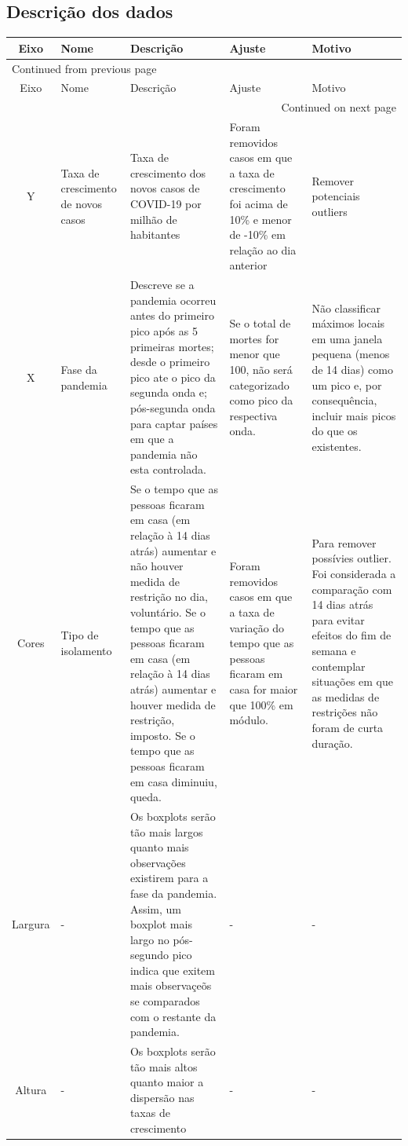 \documentclass{SelfArx}
\begin{document}
\subsection*{Descrição dos dados}
\label{sec:orgdec38e5}
\begin{longtable}{c|p{2cm}|p{5cm}|p{5cm}|p{3cm}}
\hline
Eixo & Nome & Descrição & Ajuste & Motivo\\
\hline
\endfirsthead
\multicolumn{5}{l}{Continued from previous page} \\
\hline

Eixo & Nome & Descrição & Ajuste & Motivo \\

\hline
\endhead
\hline\multicolumn{5}{r}{Continued on next page} \\
\endfoot
\endlastfoot
\hline
Y & Taxa de crescimento de novos casos & Taxa de crescimento dos novos casos de COVID-19 por milhão de habitantes & Foram removidos casos em que a taxa de crescimento foi acima de 10\% e menor de -10\% em relação ao dia anterior & Remover potenciais outliers\\
\hline
X & Fase da pandemia & Descreve se a pandemia ocorreu antes do primeiro pico após as 5 primeiras mortes; desde o primeiro pico ate o pico da segunda onda e; pós-segunda onda para captar países em que a pandemia não esta controlada. & Se o total de mortes for menor que 100, não será categorizado como pico da respectiva onda. & Não classificar máximos locais em uma janela pequena (menos de 14 dias) como um pico e, por consequência, incluir mais picos do que os existentes.\\
\hline
Cores & Tipo de isolamento & Se o tempo que as pessoas ficaram em casa (em relação à 14 dias atrás) aumentar e não houver medida de restrição no dia, voluntário. Se o tempo que as pessoas ficaram em casa (em relação à 14 dias atrás) aumentar e houver medida de restrição, imposto. Se o tempo que as pessoas ficaram em casa diminuiu, queda. & Foram removidos casos em que a taxa de variação do tempo que as pessoas ficaram em casa for maior que 100\% em módulo. & Para remover possívies outlier. Foi considerada a comparação com 14 dias atrás para evitar efeitos do fim de semana e contemplar situações em que as medidas de restrições não foram de curta duração.\\
\hline
Largura & - & Os boxplots serão tão mais largos quanto mais observações existirem para a fase da pandemia. Assim, um boxplot mais largo no pós-segundo pico indica que exitem mais observaçeõs se comparados com o restante da pandemia. & - & -\\
\hline
Altura & - & Os boxplots serão tão mais altos quanto maior a dispersão nas taxas de crescimento & - & -\\
\hline
\end{longtable}
\end{document}
